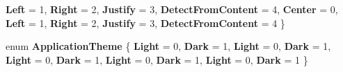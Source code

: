 \begin{DoxyCompactItemize}
\newline
{\bfseries Left} = 1, 
{\bfseries Right} = 2, 
{\bfseries Justify} = 3, 
{\bfseries Detect\+From\+Content} = 4, 
\newline
{\bfseries Center} = 0, 
{\bfseries Left} = 1, 
{\bfseries Right} = 2, 
{\bfseries Justify} = 3, 
\newline
{\bfseries Detect\+From\+Content} = 4
 \}
\item 
\mbox{\label{namespace_windows_1_1_u_i_1_1_xaml_ace78659e508744cb10b2d252833ef022}} 
enum {\bfseries Application\+Theme} \{ \newline
{\bfseries Light} = 0, 
{\bfseries Dark} = 1, 
{\bfseries Light} = 0, 
{\bfseries Dark} = 1, 
\newline
{\bfseries Light} = 0, 
{\bfseries Dark} = 1, 
{\bfseries Light} = 0, 
{\bfseries Dark} = 1, 
\newline
{\bfseries Light} = 0, 
{\bfseries Dark} = 1
 \}
\end{DoxyCompactItemize}
